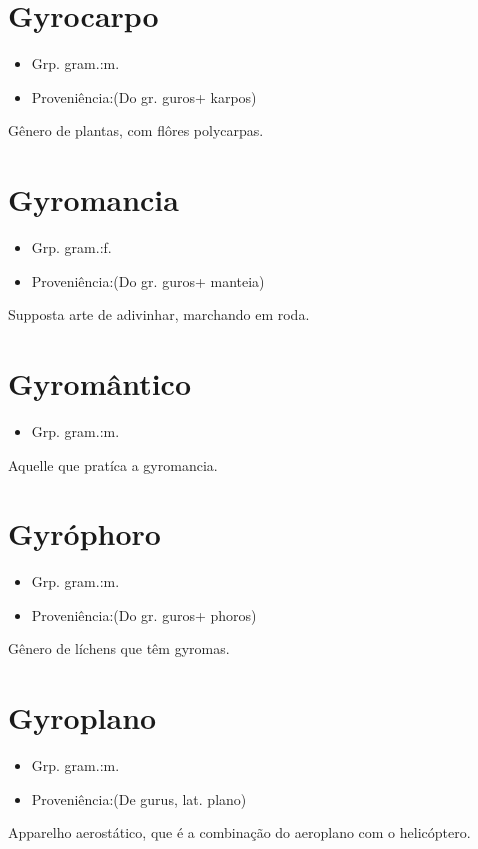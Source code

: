 \section{Gyrocarpo}
\begin{itemize}
\item {Grp. gram.:m.}
\end{itemize}
\begin{itemize}
\item {Proveniência:(Do gr. \textunderscore guros\textunderscore  + \textunderscore karpos\textunderscore )}
\end{itemize}
Gênero de plantas, com flôres polycarpas.
\section{Gyromancia}
\begin{itemize}
\item {Grp. gram.:f.}
\end{itemize}
\begin{itemize}
\item {Proveniência:(Do gr. \textunderscore guros\textunderscore  + \textunderscore manteia\textunderscore )}
\end{itemize}
Supposta arte de adivinhar, marchando em roda.
\section{Gyromântico}
\begin{itemize}
\item {Grp. gram.:m.}
\end{itemize}
Aquelle que pratíca a gyromancia.
\section{Gyróphoro}
\begin{itemize}
\item {Grp. gram.:m.}
\end{itemize}
\begin{itemize}
\item {Proveniência:(Do gr. \textunderscore guros\textunderscore  + \textunderscore phoros\textunderscore )}
\end{itemize}
Gênero de líchens que têm gyromas.
\section{Gyroplano}
\begin{itemize}
\item {Grp. gram.:m.}
\end{itemize}
\begin{itemize}
\item {Proveniência:(De \textunderscore gurus\textunderscore , lat. \textunderscore plano\textunderscore )}
\end{itemize}
Apparelho aerostático, que é a combinação do aeroplano com o helicóptero.
